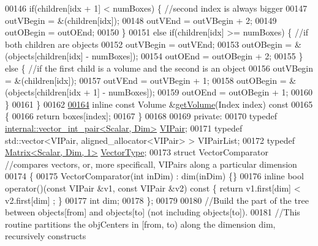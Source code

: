 \begin{DoxyCode}
00146     \textcolor{keywordflow}{if}(children[idx + 1] < numBoxes) \{ \textcolor{comment}{//second index is always bigger}
00147       outVBegin = &(children[idx]);
00148       outVEnd = outVBegin + 2;
00149       outOBegin = outOEnd;
00150     \}
00151     \textcolor{keywordflow}{else} \textcolor{keywordflow}{if}(children[idx] >= numBoxes) \{ \textcolor{comment}{//if both children are objects}
00152       outVBegin = outVEnd;
00153       outOBegin = &(objects[children[idx] - numBoxes]);
00154       outOEnd = outOBegin + 2;
00155     \} \textcolor{keywordflow}{else} \{ \textcolor{comment}{//if the first child is a volume and the second is an object}
00156       outVBegin = &(children[idx]);
00157       outVEnd = outVBegin + 1;
00158       outOBegin = &(objects[children[idx + 1] - numBoxes]);
00159       outOEnd = outOBegin + 1;
00160     \}
00161   \}
00162 
\hyperlink{class_eigen_1_1_kd_b_v_h_a59e7a2afb19fe7ae919fb95425bd6bf0}{00164}   \textcolor{keyword}{inline} \textcolor{keyword}{const} Volume &\hyperlink{class_eigen_1_1_kd_b_v_h_a59e7a2afb19fe7ae919fb95425bd6bf0}{getVolume}(Index index)\textcolor{keyword}{ const}
00165 \textcolor{keyword}{  }\{
00166     \textcolor{keywordflow}{return} boxes[index];
00167   \}
00168 
00169 \textcolor{keyword}{private}:
00170   \textcolor{keyword}{typedef} \hyperlink{struct_eigen_1_1internal_1_1vector__int__pair}{internal::vector\_int\_pair<Scalar, Dim>} 
      \hyperlink{struct_eigen_1_1internal_1_1vector__int__pair}{VIPair};
00171   \textcolor{keyword}{typedef} std::vector<VIPair, aligned\_allocator<VIPair> > VIPairList;
00172   \textcolor{keyword}{typedef} \hyperlink{group___core___module}{Matrix<Scalar, Dim, 1>} \hyperlink{group___core___module}{VectorType};
00173   \textcolor{keyword}{struct }VectorComparator \textcolor{comment}{//compares vectors, or, more specificall, VIPairs along a particular dimension}
00174   \{
00175     VectorComparator(\textcolor{keywordtype}{int} inDim) : dim(inDim) \{\}
00176     \textcolor{keyword}{inline} \textcolor{keywordtype}{bool} operator()(\textcolor{keyword}{const} VIPair &v1, \textcolor{keyword}{const} VIPair &v2)\textcolor{keyword}{ const }\{ \textcolor{keywordflow}{return} v1.first[dim] < v2.first[dim]
      ; \}
00177     \textcolor{keywordtype}{int} dim;
00178   \};
00179 
00180   \textcolor{comment}{//Build the part of the tree between objects[from] and objects[to] (not including objects[to]).}
00181   \textcolor{comment}{//This routine partitions the objCenters in [from, to) along the dimension dim, recursively constructs}

\end{DoxyCode}
